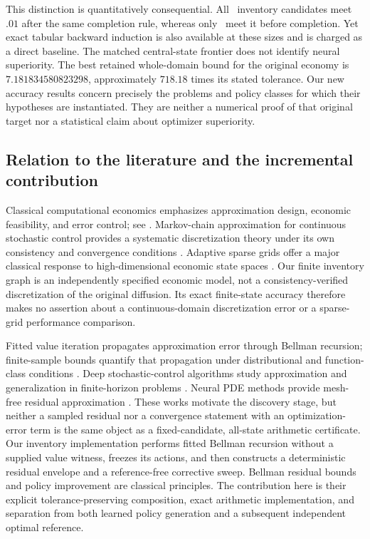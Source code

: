 This distinction is quantitatively consequential. All \InventoryCases\ inventory candidates meet $.01$ after the same completion rule, whereas only \InventoryRawPass\ meet it before completion. Yet exact tabular backward induction is also available at these sizes and is charged as a direct baseline. The matched central-state frontier does not identify neural superiority. The best retained whole-domain bound for the original economy is $7.181834580823298$, approximately $718.18$ times its stated tolerance. Our new accuracy results concern precisely the problems and policy classes for which their hypotheses are instantiated. They are neither a numerical proof of that original target nor a statistical claim about optimizer superiority.

\subsection{Relation to the literature and the incremental contribution}
Classical computational economics emphasizes approximation design, economic feasibility, and error control; see \citet{Judd1998}. Markov-chain approximation for continuous stochastic control provides a systematic discretization theory under its own consistency and convergence conditions \citep{KushnerDupuis2001}. Adaptive sparse grids offer a major classical response to high-dimensional economic state spaces \citep{BrummScheidegger2017}. Our finite inventory graph is an independently specified economic model, not a consistency-verified discretization of the original diffusion. Its exact finite-state accuracy therefore makes no assertion about a continuous-domain discretization error or a sparse-grid performance comparison.

Fitted value iteration propagates approximation error through Bellman recursion; finite-sample bounds quantify that propagation under distributional and function-class conditions \citep{MunosSzepesvari2008}. Deep stochastic-control algorithms study approximation and generalization in finite-horizon problems \citep{HureEtAl2021}. Neural PDE methods provide mesh-free residual approximation \citep{SirignanoSpiliopoulos2018}. These works motivate the discovery stage, but neither a sampled residual nor a convergence statement with an optimization-error term is the same object as a fixed-candidate, all-state arithmetic certificate. Our inventory implementation performs fitted Bellman recursion without a supplied value witness, freezes its actions, and then constructs a deterministic residual envelope and a reference-free corrective sweep. Bellman residual bounds and policy improvement are classical principles. The contribution here is their explicit tolerance-preserving composition, exact arithmetic implementation, and separation from both learned policy generation and a subsequent independent optimal reference.

